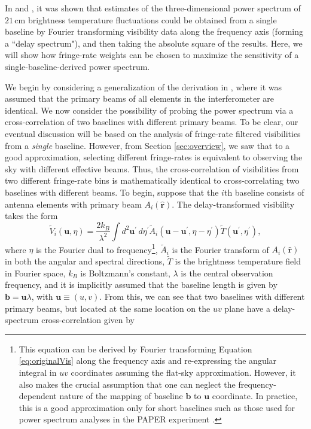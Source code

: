 \documentclass[twocolumn,apj,numberedappendix]{emulateapj}
\newcommand{\rhat}{\hat{\mathbf{r}}}
\begin{document}
In \citet{parsons_et_al2012a} and \citet{P14}, it was shown that estimates of the three-dimensional power spectrum of $21\,\textrm{cm}$ brightness temperature fluctuations could be obtained from a single baseline by Fourier transforming visibility data along the frequency axis (forming a ``delay spectrum"), and then taking the absolute square of the results. Here, we will show how fringe-rate weights can be chosen to maximize the sensitivity of a single-baseline-derived power spectrum.

We begin by considering a generalization of the derivation in \citet{P14}, where it was assumed that the primary beams of all elements in the interferometer are identical. We now consider the possibility of probing the power spectrum via a cross-correlation of two baselines with different primary beams. To be clear, our eventual discussion will be based on the analysis of fringe-rate filtered visibilities from a \emph{single} baseline. However, from Section \ref{sec:overview}, we saw that to a good approximation, selecting different fringe-rates is equivalent to observing the sky with different effective beams. Thus, the cross-correlation of visibilities from two different fringe-rate bins is mathematically identical to cross-correlating two baselines with different beams. To begin, suppose that the $i$th baseline consists of antenna elements with primary beam $A_i (\rhat)$. The delay-transformed visibility takes the form
\begin{equation}
\widetilde{V}_i(\mathbf{u},\eta) = \frac{2 k_B}{\lambda^2} \int  d^2 \mathbf{u}^\prime \, d\eta^\prime \widetilde{A}_i (\mathbf{u} -\mathbf{u}^\prime, \eta-\eta^\prime) \widetilde{T}(\mathbf{u}^\prime , \eta^\prime),
\end{equation}
where $\eta$ is the Fourier dual to frequency\footnote{This equation can be derived by Fourier transforming Equation 
\ref{eq:originalVis} along the frequency axis and re-expressing the angular integral in $uv$ coordinates assuming the flat-sky approximation. However, it also makes the crucial assumption that one can neglect the frequency-dependent nature of the mapping of baseline $\mathbf{b}$ to $\mathbf{u}$ coordinate. In practice, this is a good approximation only for short baselines \citep{parsons_et_al2012b,liu_et_al2014a} such as those used for power spectrum analyses in the PAPER experiment \citep{P14,J14,ali_et_al2015}.
}, $\widetilde{A}_i $ is the Fourier transform of $A_i (\rhat)$ in both the angular and spectral directions, $\widetilde{T}$ is the brightness temperature field in Fourier space, $k_B$ is Boltzmann's constant, $\lambda$ is the central observation frequency, and it is implicitly assumed that the baseline length is given by $\mathbf{b} = \mathbf{u} \lambda$, with $\mathbf{u} \equiv (u,v)$. From this, we can see that two baselines with different primary beams, but located at the same location on the $uv$ plane have a delay-spectrum cross-correlation given by
\end{document}
